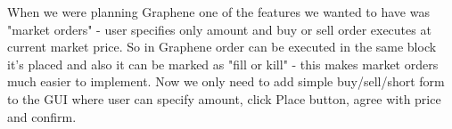 
When we were planning Graphene one of the features we wanted to have was
"market orders" - user specifies only amount and buy or sell order executes at
current market price. So in Graphene order can be executed in the same block
it's placed and also it can be marked as "fill or kill" - this makes market
orders much easier to implement. Now we only need to add simple buy/sell/short
form to the GUI where user can specify amount, click Place button, agree with
price and confirm.
